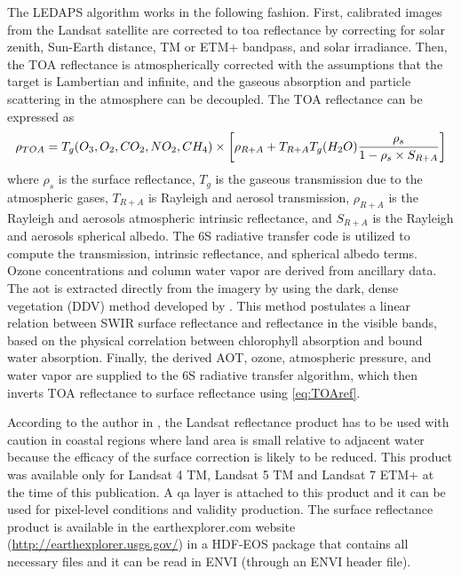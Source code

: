 The LEDAPS algorithm works in the following fashion. First, calibrated images from the Landsat satellite are corrected to \gls{toa} reflectance by correcting for solar zenith, Sun-Earth distance, TM or ETM+ bandpass, and solar irradiance. Then, the TOA reflectance is atmospherically corrected with the assumptions that the target is Lambertian and infinite, and the gaseous absorption and particle scattering in the atmosphere can be decoupled. The TOA reflectance \citep{Masek:2006} can be expressed as
\begin{equation}
	\rho_{TOA}=T_g(O_3,O_2,CO_2,NO_2,CH_4)\\	
		\times \left[\rho_{R+A}+T_{R+A}T_g(H_2O)\frac{\rho_s}{1-\rho_s\times S_{R+A}}\right]
		\label{eq:TOAref} 
\end{equation}
\noindent where $\rho_s$ is the surface reflectance, $T_g$ is the gaseous transmission due to the atmospheric gases, $T_{R+A}$ is Rayleigh and aerosol transmission, $\rho_{R+A}$ is the Rayleigh and aerosols atmospheric intrinsic reflectance, and $S_{R+A}$ is the Rayleigh and aerosols spherical albedo. The 6S radiative transfer code is utilized to compute the transmission, intrinsic reflectance, and spherical albedo terms. Ozone concentrations and column water vapor are derived from ancillary data. The \gls{aot} is extracted directly from the imagery by using the dark, dense vegetation (DDV) method developed by \citet{Kaufman_1997}. This method postulates a linear relation between SWIR surface reflectance and reflectance in the visible bands, based on the physical correlation between chlorophyll absorption and bound water absorption. Finally, the derived AOT, ozone, atmospheric pressure, and water vapor are supplied to the 6S radiative transfer algorithm, which then inverts TOA reflectance to surface reflectance using \autoref{eq:TOAref}. 

According to the author in \citet{LandsatCDR}, the Landsat reflectance product has to be used with caution in coastal regions where land area is small relative to adjacent water because the efficacy of the surface correction is likely to be reduced. This product was available only for Landsat 4 TM, Landsat 5 TM and Landsat 7 ETM+ at the time of this publication. A \gls{qa} layer is attached to this product and it can be used for pixel-level conditions and validity production. The surface reflectance product is available in the earthexplorer.com website (\url{http://earthexplorer.usgs.gov/}) in a HDF-EOS package that contains all necessary files and it can be read in ENVI (through an ENVI header file).

